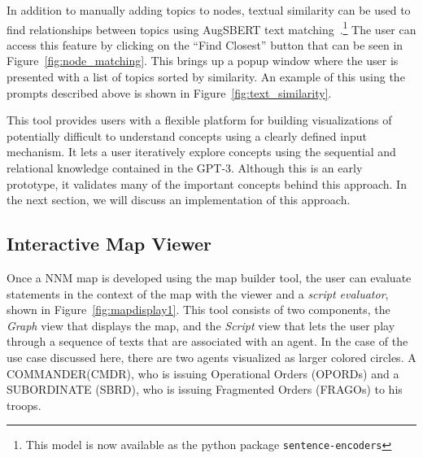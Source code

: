 \documentclass[11pt,dvipdfm]{article}
\begin{document}
In addition to manually adding topics to nodes, textual similarity can be used to find relationships between topics using AugSBERT text matching~\cite{reimers-2019-sentence-bert}.\footnote{This model is now available as the python package \texttt{sentence-encoders}} The user can access this feature by clicking on the \enquote{Find Closest} button that can be seen in Figure~\ref{fig:node_matching}. This brings up a popup window where the user is presented with a list of topics sorted by similarity. An example of this using the prompts described above is shown in Figure~\ref{fig:text_similarity}.

This tool provides users with a flexible platform for building visualizations of potentially difficult to understand concepts using a clearly defined input mechanism. It lets a user iteratively explore concepts using the sequential and relational knowledge contained in the GPT-3. Although this is an early prototype, it validates many of the important concepts behind this approach. In the next section, we will discuss an implementation of this approach.

\subsection{Interactive Map Viewer}
\label{sec:interactive_viewer}

Once a NNM map is developed using the map builder tool, the user can evaluate statements in the context of the map with the viewer and a \textit{script evaluator}, shown in Figure~\ref{fig:mapdisplay1}. This tool consists of two components, the \textit{Graph} view that displays the map, and the \textit{Script} view that lets the user play through a sequence of texts that are associated with an agent. In the case of the use case discussed here, there are two agents visualized as larger colored circles. A COMMANDER(\textcolor{CMDRcolor}{CMDR}), who is issuing Operational Orders (OPORDs) and a SUBORDINATE (\textcolor{SBRDcolor}{SBRD}), who is issuing Fragmented Orders (FRAGOs) to his troops. 
\end{document}
